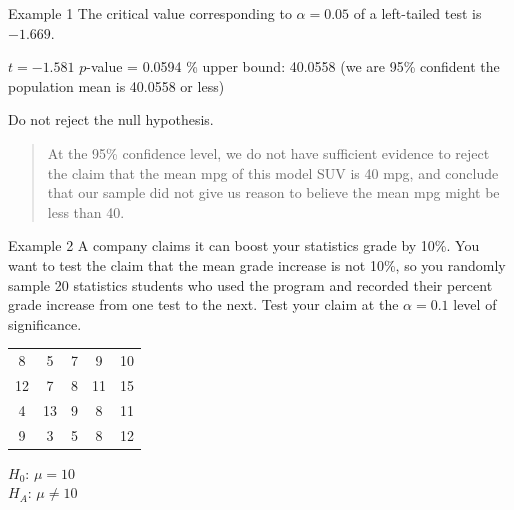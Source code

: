 \documentclass[t]{beamer}
\begin{document}
\begin{frame}{Example 1}
The critical value corresponding to $\alpha=0.05$ of a left-tailed test is $-1.669$. \newline\\	\pause

$t = -1.581$ \newline
$p$-value = 0.0594	\% upper bound: 40.0558  \newline (we are 95\% confident the population mean is 40.0558 or less)\newline\\	\pause

Do not reject the null hypothesis.	\newline\\ \pause
\begin{quote}
At the 95\% confidence level, we do not have sufficient evidence to reject the claim that the mean mpg of this model SUV is 40 mpg, and conclude that our sample did not give us reason to believe the mean mpg might be less than 40.
\end{quote}
\end{frame}

\begin{frame}{Example 2}
A company claims it can boost your statistics grade by 10\%. You want to test the claim that the mean grade increase is not 10\%, so you randomly sample 20 statistics students who used the program and recorded their percent grade increase from one test to the next. Test your claim at the $\alpha = 0.1$ level of significance. \newline\\

\begin{center}
\begin{tabular}{ccccc}
8 & 5 & 7 & 9 & 10 \\
12 & 7 & 8 & 11 & 15 \\
4 & 13 & 9 & 8 & 11 \\
9 & 3 & 5 & 8 & 12 \\
\end{tabular}
\end{center}
\pause

$H_0: \, \mu = 10$ \\
$H_A: \, \mu \neq 10$
\end{frame}
\end{document}
